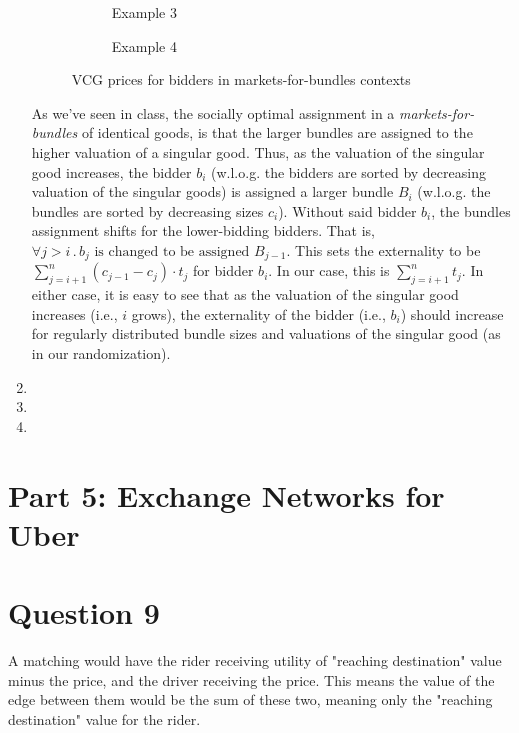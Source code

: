 \documentclass{article}
\begin{document}
\begin{enumerate}[label=(\alph*)]
\begin{figure*}[ht]
        \begin{subfigure}{0.49\textwidth}
            \centering
            \resizebox{\textwidth}{!}{}
            \caption{Example 3}
        \end{subfigure}
        \hfill
        \begin{subfigure}{0.49\textwidth}
            \centering
            \resizebox{\textwidth}{!}{}
            \caption{Example 4}
        \end{subfigure}
        
        \caption{VCG prices for bidders in markets-for-bundles contexts}
        \label{fig:b2a}
    \end{figure*}
    
    As we've seen in class, the socially optimal assignment in a \textit{markets-for-bundles} of identical goods, is that the larger bundles are assigned to the higher valuation of a singular good. Thus, as the valuation of the singular good increases, the bidder $b_i$ (w.l.o.g. the bidders are sorted by decreasing valuation of the singular goods) is assigned a larger bundle $B_i$ (w.l.o.g. the bundles are sorted by decreasing sizes $c_i$). Without said bidder $b_i$, the bundles assignment shifts for the lower-bidding bidders. That is, $\forall j > i \, . \, b_j \text{ is changed to be assigned } B_{j-1}$. This sets the externality to be $\sum_{j=i+1}^{n} (c_{j-1} - c_j) \cdot t_j$ for bidder $b_i$. In our case, this is $\sum_{j=i+1}^{n} t_j$. In either case, it is easy to see that as the valuation of the singular good increases (i.e., $i$ grows), the externality of the bidder (i.e., $b_i$) should increase for regularly distributed bundle sizes and valuations of the singular good (as in our randomization).

    \item 


    \item 

    
    \item 


\end{enumerate}

\section*{Part 5: Exchange Networks for Uber}
\setcounter{section}{0}


\section{Question 9}
A matching would have the rider receiving utility of "reaching destination" value minus the price, and the driver receiving the price. This means the value of the edge between them would be the sum of these two, meaning only the "reaching destination" value for the rider.
\end{document}
